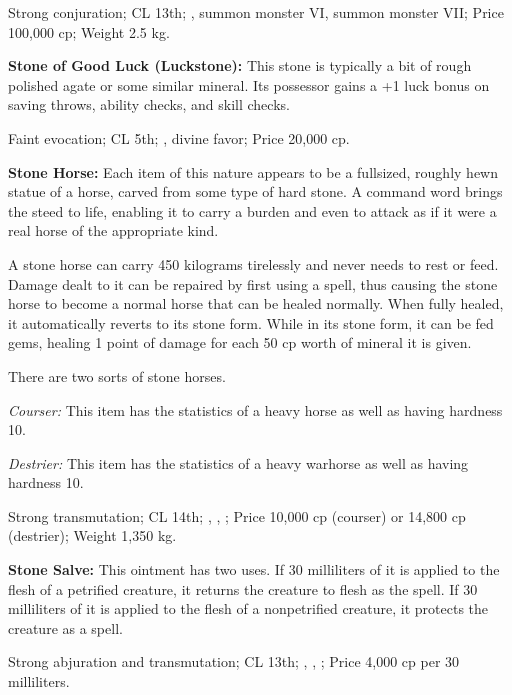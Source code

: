 Strong conjuration; CL 13th; , summon monster VI, summon monster VII; Price 100,000 cp; Weight 2.5 kg.



\textbf{Stone of Good Luck (Luckstone):} This stone is typically a bit of rough polished agate or some similar mineral. Its possessor gains a +1 luck bonus on saving throws, ability checks, and skill checks.

Faint evocation; CL 5th; , divine favor; Price 20,000 cp.



\textbf{Stone Horse:} Each item of this nature appears to be a fullsized, roughly hewn statue of a horse, carved from some type of hard stone. A command word brings the steed to life, enabling it to carry a burden and even to attack as if it were a real horse of the appropriate kind.

A stone horse can carry 450 kilograms tirelessly and never needs to rest or feed. Damage dealt to it can be repaired by first using a  spell, thus causing the stone horse to become a normal horse that can be healed normally. When fully healed, it automatically reverts to its stone form. While in its stone form, it can be fed gems, healing 1 point of damage for each 50 cp worth of mineral it is given.

There are two sorts of stone horses.

\begin{itemize*}
\item \textit{Courser:} This item has the statistics of a heavy horse as well as having hardness 10.
\item \textit{Destrier:} This item has the statistics of a heavy warhorse as well as having hardness 10.
\end{itemize*}

Strong transmutation; CL 14th; , , ; Price 10,000 cp (courser) or 14,800 cp (destrier); Weight 1,350 kg.



\textbf{Stone Salve:} This ointment has two uses. If 30 milliliters of it is applied to the flesh of a petrified creature, it returns the creature to flesh as the  spell. If 30 milliliters of it is applied to the flesh of a nonpetrified creature, it protects the creature as a  spell.

Strong abjuration and transmutation; CL 13th; , , ; Price 4,000 cp per 30 milliliters.



